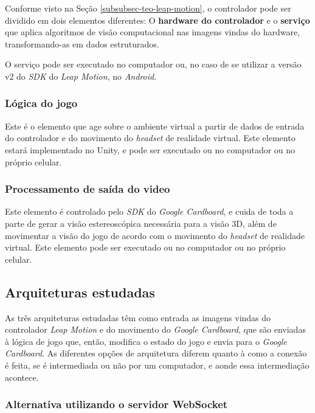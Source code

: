 Conforme visto na Seção \ref{subsubsec-teo-leap-motion}, o controlador pode 
ser dividido em dois elementos diferentes: O \textbf{hardware do controlador} e 
o \textbf{serviço} que aplica algoritmos de visão computacional nas imagens 
vindas do hardware, transformando-as em dados estruturados.

O serviço pode ser executado no computador ou, no caso de se utilizar a versão 
v2 do \textit{SDK} do \textit{Leap Motion}, no \textit{Android}.

\subsubsection{Lógica do jogo}\label{subsubsec-elemento-logica-jogo}

Este é o elemento que age sobre o ambiente virtual a partir de dados de entrada 
do controlador e do movimento do \textit{headset} de realidade virtual. 
Este elemento estará implementado no Unity, e pode ser executado ou no 
computador ou no próprio celular.

\subsubsection{Processamento de saída do video}\label{subsubsec-elemento-video}

Este elemento é controlado pelo \textit{SDK} do \textit{Google Cardboard}, e 
cuida de toda a parte de gerar a visão estereoscópica necessária para a visão 
3D, além de movimentar a visão do jogo de acordo com o movimento do 
\textit{headset} de realidade virtual. Este elemento pode ser executado ou 
no computador ou no próprio celular.

\subsection{Arquiteturas estudadas}\label{subsec-arquiteturas-estudadas}

As três arquiteturas estudadas têm como entrada as imagens vindas do 
controlador \textit{Leap Motion} e do movimento do \textit{Google Cardboard}, 
que são enviadas à lógica de jogo que, então, modifica o estado do jogo e envia 
para o \textit{Google Cardboard}. As diferentes opções de arquitetura diferem 
quanto à como a conexão é feita, se é intermediada ou não por um computador, e 
aonde essa intermediação acontece.

\subsubsection{Alternativa utilizando o servidor WebSocket}\label{subsubsec-arquiteturas-leapmotion-pc-leapdata-android}

